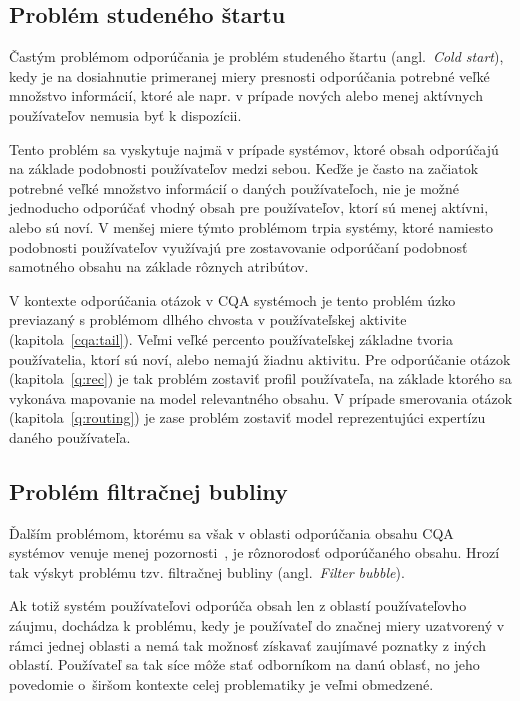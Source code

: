 \subsection{Problém studeného štartu}\label{cold-start}

Častým problémom odporúčania je problém studeného štartu (angl.~\emph{Cold start}), kedy je na dosiahnutie primeranej
miery presnosti odporúčania potrebné veľké množstvo informácií, ktoré ale napr. v prípade nových alebo menej aktívnych
používateľov nemusia byť k dispozícii.

Tento problém sa vyskytuje najmä v prípade systémov, ktoré obsah odporúčajú na základe
podobnosti používateľov medzi sebou. Keďže je často na začiatok potrebné veľké množstvo informácií o daných používateľoch,
nie je možné jednoducho odporúčať vhodný obsah pre používateľov, ktorí sú menej aktívni, alebo sú noví.
V menšej miere týmto problémom trpia systémy, ktoré namiesto podobnosti používateľov využívajú pre zostavovanie odporúčaní
podobnosť samotného obsahu na základe rôznych atribútov.

V kontexte odporúčania otázok v CQA systémoch je tento problém úzko previazaný s problémom dlhého chvosta v používateľskej aktivite (kapitola~\ref{cqa:tail}).
Veľmi veľké percento používateľskej základne tvoria používatelia, ktorí sú noví, alebo nemajú žiadnu aktivitu.
Pre odporúčanie otázok (kapitola~\ref{q:rec}) je tak problém zostaviť profil používateľa, na základe ktorého sa vykonáva
mapovanie na model relevantného obsahu. V prípade smerovania otázok (kapitola~\ref{q:routing}) je zase problém zostaviť
model reprezentujúci expertízu daného používateľa.

\subsection{Problém filtračnej bubliny}\label{rec:filterbubble}

Ďalším problémom, ktorému sa však v oblasti odporúčania obsahu CQA systémov venuje menej pozornosti~\cite{Srba2016},
je rôznorodosť odporúčaného obsahu. Hrozí tak výskyt problému tzv. filtračnej bubliny (angl.~\emph{Filter bubble}).

Ak totiž systém používateľovi odporúča obsah len z oblastí používateľovho záujmu, dochádza k problému, kedy je používateľ
do značnej miery uzatvorený v rámci jednej oblasti a nemá tak možnosť získavať zaujímavé poznatky z iných oblastí.
Používateľ sa tak síce môže stať odborníkom na danú oblasť, no jeho povedomie o~širšom kontexte celej problematiky
je veľmi obmedzené.

